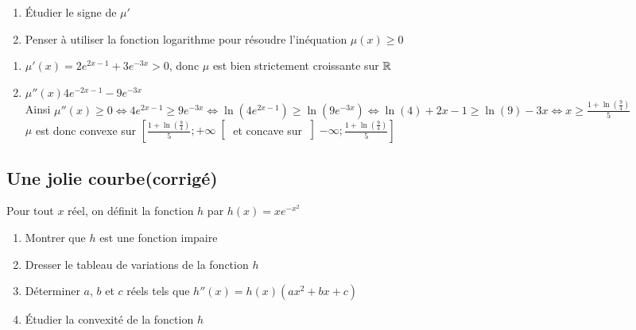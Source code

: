 \documentclass[oneside,12pt]{book}          %
\begin{document}
\begin{hint}
	\begin{enumerate}
		\item Étudier le signe de $\mu'$
		\item Penser à utiliser la fonction logarithme pour résoudre l'inéquation $\mu(x)\geq0$
	\end{enumerate}
\end{hint}
\begin{sol}
\begin{enumerate}
	\item $\mu'(x)=2e^{2x-1}+3e^{-3x}>0$, donc $\mu$ est bien strictement croissante sur ${\mathbb R}$
	\item $\mu''(x)4e^{-2x-1}-9e^{-3x}$\\
	Ainsi $\mu''(x)\geq0\Leftrightarrow 4e^{2x-1}\geq9e^{-3x}\Leftrightarrow \ln\left(4e^{2x-1}\right)\geq\ln\left(9e^{-3x}\right)\Leftrightarrow \ln(4)+2x-1\geq\ln(9)-3x\Leftrightarrow x\geq\frac{1+\ln\left(\frac{9}{4}\right)}{5}$\\
	$\mu$ est donc convexe sur $\left[\frac{1+\ln\left(\frac{9}{4}\right)}{5};+\infty\right[$ et concave sur $\left]-\infty;\frac{1+\ln\left(\frac{9}{4}\right)}{5}\right]$
\end{enumerate}
\end{sol}



\subsection{Une jolie courbe\quad\small{(corrigé)}}
Pour tout $x$ réel, on définit la fonction $h$ par $h(x)=xe^{-x^2}$
\begin{enumerate}
    \item Montrer que $h$ est une fonction impaire
    \item Dresser le tableau de variations de la fonction $h$
    \item Déterminer $a$, $b$ et $c$ réels tels que $h''(x)=h(x)(ax^2+bx+c)$
    \item Étudier la convexité de la fonction $h$
\end{enumerate}
\end{document}

